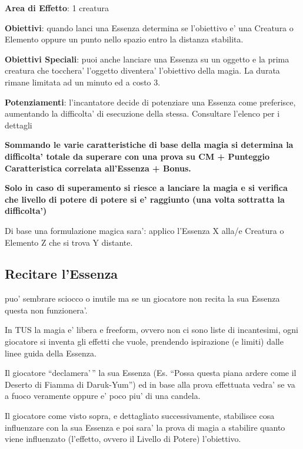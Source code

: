 \documentclass[a4paper,11pt,twoside,openany]{dndbook}
\begin{document}
\textbf{Area di Effetto}: 1 creatura 

\textbf{Obiettivi}: quando lanci una Essenza determina se l'obiettivo e' una Creatura o Elemento oppure un punto nello spazio entro la distanza stabilita.

\textbf{Obiettivi Speciali}: puoi anche lanciare una Essenza su un oggetto e la prima creatura che tocchera' l'oggetto diventera' l'obiettivo della magia. La durata rimane limitata ad un minuto ed a costo 3.

\textbf{Potenziamenti}: l'incantatore decide di potenziare una Essenza come preferisce, aumentando la difficolta' di esecuzione della stessa. Consultare l'elenco per i dettagli

\textbf{Sommando le varie caratteristiche di base della magia si determina la difficolta' totale da superare con una prova su CM + Punteggio Caratteristica correlata all'Essenza + Bonus.}

\textbf{Solo in caso di superamento si riesce a lanciare la magia e si verifica che livello di potere di potere si e' raggiunto (una volta sottratta la difficolta')}

Di base una formulazione magica sara': applico l'Essenza X alla/e Creatura o Elemento Z che si trova Y distante.

\subsection{Recitare l'Essenza}

\label{recitare-lessenza}

puo' sembrare sciocco o inutile ma se un giocatore non recita la sua Essenza questa non funzionera'.

In TUS la magia e' libera e freeform, ovvero non ci sono liste di incantesimi, ogni giocatore si inventa gli effetti che vuole, prendendo ispirazione (e limiti) dalle linee guida della Essenza.

Il giocatore ``declamera'\,'' la sua Essenza (Es. ``Possa questa piana ardere come il Deserto di Fiamma di Daruk-Yum'') ed in base alla prova effettuata vedra' se va a fuoco veramente oppure e' poco piu' di una candela.

Il giocatore come visto sopra, e dettagliato successivamente, stabilisce cosa influenzare con la sua Essenza e poi sara' la prova di magia a stabilire quanto viene influenzato (l'effetto, ovvero il Livello di Potere) l'obiettivo.
\end{document}

